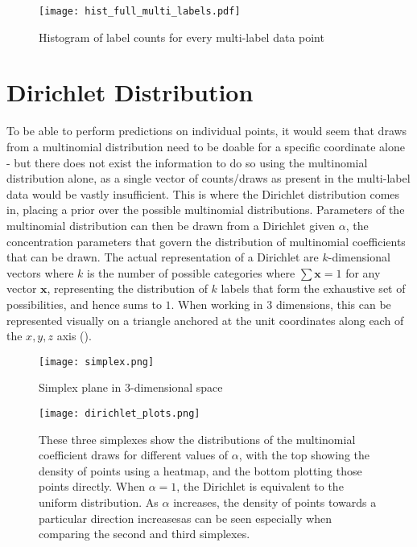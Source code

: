 \begin{figure}
    \texttt{[image: hist\_full\_multi\_labels.pdf]}
    \caption{Histogram of label counts for every multi-label data point}
    \label{fig:exhist}
\end{figure}

\section{Dirichlet Distribution}
To be able to perform predictions on individual points, it would seem that draws from a multinomial distribution need to be doable for a specific coordinate alone - but there does not exist the information to do so using the multinomial distribution alone, as a single vector of counts/draws as present in the multi-label data would be vastly insufficient. This is where the Dirichlet distribution comes in, placing a prior over the possible multinomial distributions. Parameters of the multinomial distribution can then be drawn from a Dirichlet given $\alpha$, the concentration parameters that govern the distribution of multinomial coefficients that can be drawn. The actual representation of a Dirichlet are $k$-dimensional vectors where $k$ is the number of possible categories where $\sum \mathbf{x} = 1$ for any vector $\mathbf{x}$, representing the distribution of $k$ labels that form the exhaustive set of possibilities, and hence sums to $1$. When working in $3$ dimensions, this can be represented visually on a triangle anchored at the unit coordinates along each of the $x, y, z$ axis ().

\begin{figure}
    \begin{minipage}{\linewidth}
        \centering
        \texttt{[image: simplex.png]}
        \caption*{Simplex plane in $3$-dimensional space}
    \end{minipage}
    \begin{minipage}{\linewidth}
        \texttt{[image: dirichlet\_plots.png]}
        \caption*{These three simplexes show the distributions of the multinomial coefficient draws for different values of $\alpha$, with the top showing the density of points using a heatmap, and the bottom plotting those points directly. When $\alpha=1$, the Dirichlet is equivalent to the uniform distribution. As $\alpha$ increases, the density of points towards a particular direction increasesas can be seen especially when comparing the second and third simplexes.}
    \end{minipage}
    \caption{}
    \label{fig:simplex}
\end{figure}

